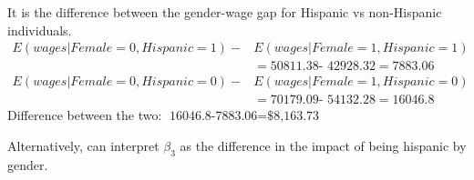 \documentclass{./../../Latex/handout}
\begin{document}
\begin{enumerate}
\begin{enumerate}
	It is the difference between the gender-wage gap for Hispanic vs non-Hispanic individuals. 
\begin{align*}
 E(wages |Female = 0, Hispanic = 1)-& E(wages |Female = 1, Hispanic = 1) \\
 & = \text{50811.38- 42928.32} = \text{7883.06} \\
 E(wages |Female = 0, Hispanic = 0)-& E(wages |Female = 1, Hispanic = 0)  \\
  & = \text{70179.09- 54132.28} = \text{16046.8}  
\end{align*} 	
Difference between the two: $\text{16046.8-7883.06}=\text{\$8,163.73}$

Alternatively, can interpret $\beta_3$ as the difference in the impact of being hispanic by gender. 
\end{enumerate}
\end{enumerate}
\end{document}
